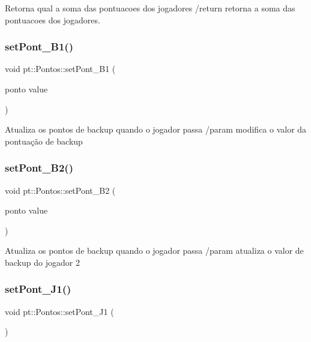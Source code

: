 Retorna qual a soma das pontuacoes dos jogadores /return retorna a soma das pontuacoes dos jogadores. \mbox{\label{structpt_1_1Pontos_a46b9cb3a776b33abeb75e9d9d3119609}} 
\subsubsection{\texorpdfstring{set\+Pont\+\_\+\+B1()}{setPont\_B1()}}
{\footnotesize\ttfamily void pt\+::\+Pontos\+::set\+Pont\+\_\+\+B1 (\begin{DoxyParamCaption}\item[{ponto}]{value }\end{DoxyParamCaption})\hspace{0.3cm}{\ttfamily [inline]}}

Atualiza os pontos de backup quando o jogador passa /param modifica o valor da pontuação de backup \mbox{\label{structpt_1_1Pontos_a6bf5a548d754cd90321fd7fdbab5f35c}} 
\subsubsection{\texorpdfstring{set\+Pont\+\_\+\+B2()}{setPont\_B2()}}
{\footnotesize\ttfamily void pt\+::\+Pontos\+::set\+Pont\+\_\+\+B2 (\begin{DoxyParamCaption}\item[{ponto}]{value }\end{DoxyParamCaption})\hspace{0.3cm}{\ttfamily [inline]}}

Atualiza os pontos de backup quando o jogador passa /param atualiza o valor de backup do jogador 2 \mbox{\label{structpt_1_1Pontos_ac8acbdd83e34fd0f5f06f865d3a7b636}} 
\subsubsection{\texorpdfstring{set\+Pont\+\_\+\+J1()}{setPont\_J1()}}
{\footnotesize\ttfamily void pt\+::\+Pontos\+::set\+Pont\+\_\+\+J1 (\begin{DoxyParamCaption}{ }\end{DoxyParamCaption})\hspace{0.3cm}{\ttfamily [inline]}}

